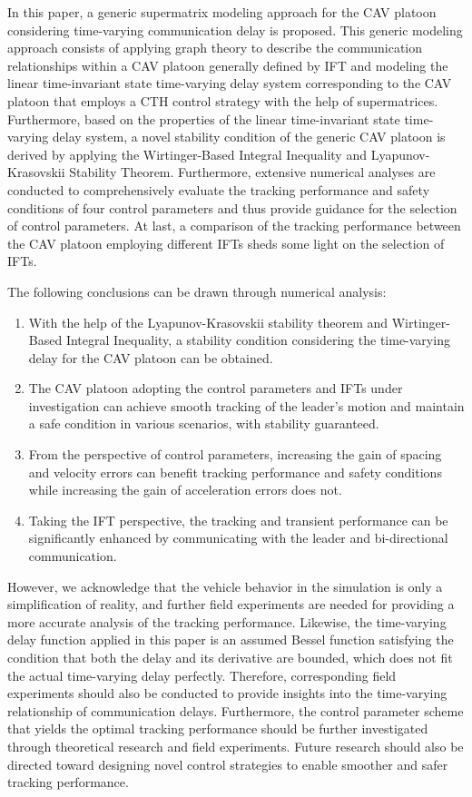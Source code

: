 \documentclass[a4paper]{cas-sc}
\begin{document}
In this paper, a generic supermatrix modeling approach for the CAV platoon considering time-varying communication delay is proposed. This generic modeling approach consists of applying graph theory to describe the communication relationships within a CAV platoon generally defined by IFT and modeling the linear time-invariant state time-varying delay system corresponding to the CAV platoon that employs a CTH control strategy with the help of supermatrices. Furthermore, based on the properties of the linear time-invariant state time-varying delay system, a novel stability condition of the generic CAV platoon is derived by applying the Wirtinger-Based Integral Inequality and Lyapunov-Krasovskii Stability Theorem. Furthermore, extensive numerical analyses are conducted to comprehensively evaluate the tracking performance and safety conditions of four control parameters and thus provide guidance for the selection of control parameters. At last, a comparison of the tracking performance between the CAV platoon employing different IFTs sheds some light on the selection of IFTs.

The following conclusions can be drawn through numerical analysis:
\begin{enumerate}
  \item With the help of the Lyapunov-Krasovskii stability theorem and Wirtinger-Based Integral Inequality, a stability condition considering the time-varying delay for the CAV platoon can be obtained.
  \item The CAV platoon adopting the control parameters and IFTs under investigation can achieve smooth tracking of the leader's motion and maintain a safe condition in various scenarios, with stability guaranteed.
  \item From the perspective of control parameters, increasing the gain of spacing and velocity errors can benefit tracking performance and safety conditions while increasing the gain of acceleration errors does not.
  \item Taking the IFT perspective, the tracking and transient performance can be significantly enhanced by communicating with the leader and bi-directional communication.
\end{enumerate}


However, we acknowledge that the vehicle behavior in the simulation is only a simplification of reality, and further field experiments are needed for providing a more accurate analysis of the tracking performance. Likewise, the time-varying delay function applied in this paper is an assumed Bessel function satisfying the condition that both the delay and its derivative are bounded, which does not fit the actual time-varying delay perfectly. Therefore, corresponding field experiments should also be conducted to provide insights into the time-varying relationship of communication delays. Furthermore, the control parameter scheme that yields the optimal tracking performance should be further investigated through theoretical research and field experiments. Future research should also be directed toward designing novel control strategies to enable smoother and safer tracking performance.
\end{document}
